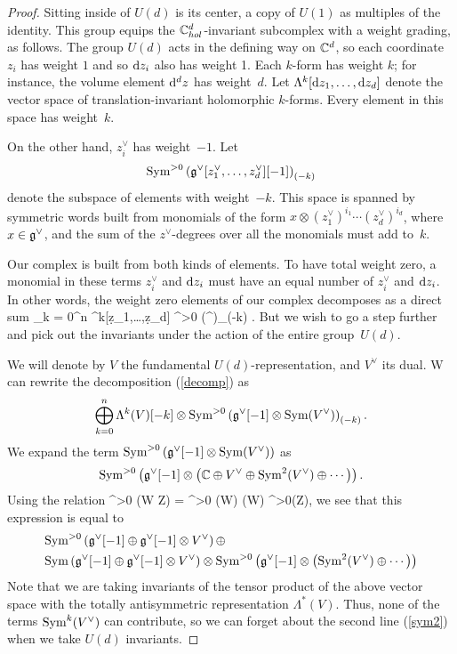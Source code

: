 \begin{proof}
Sitting inside of $U(d)$ is its center, a copy of $U(1)$ as multiples of the identity.
This group equips the $\mathbb C^d_{hol}$-invariant subcomplex with a weight grading, as follows.
The group $U(d)$ acts in the defining way on $\mathbb C^d$,
so each coordinate $z_i$ has weight $1$ and so ${\rm d} z_i$ also has weight 1.
Each $k$-form has weight $k$; for instance, the volume element ${\rm d}^d z$ has weight~$d$.
Let $\Lambda^k[{\rm d} z_1,\ldots,{\rm d} z_d]$ denote the vector space of translation-invariant holomorphic $k$-forms.
Every element in this space has weight~$k$.

On the other hand, $z_i^\vee$ has weight~$-1$. 
Let 
\[
{\rm Sym}^{>0} \left(\mathfrak g^\vee [z_1^\vee,\ldots,z_d^\vee][-1] \right)_{(-k)}
\]
denote the subspace of elements with weight~$-k$.
This space is spanned by symmetric words built from monomials of the form $x \otimes (z_1^\vee)^{i_1} \cdots (z_d^\vee)^{i_d}$, where $x \in \mathfrak g^\vee$,
and the sum of the $z^\vee$-degrees over all the monomials must add to~$k$.

Our complex is built from both kinds of elements.
To have total weight zero, a monomial in these terms $z_i^\vee$ and ${\rm d} z_i$ must have an equal number of $z_i^\vee$ and ${\rm d} z_i$.
In other words, the weight zero elements of our complex decomposes as a direct sum
\beqn\label{decomp}
\bigoplus_{k = 0}^n \Lambda^k[\d z_1,\ldots,\d z_d] \otimes \Sym^{>0} \left(\fg^ \right)_{(-k)} .
\eeqn
But we wish to go a step further and pick out the invariants under the action of the entire group~$U(d)$.

We will denote by $V$ the fundamental $U(d)$-representation, and $V^\vee$ its dual.
W can rewrite the decomposition (\ref{decomp}) as 
\[
\bigoplus_{k = 0}^n \Lambda^k(V)[-k] \otimes {\rm Sym}^{>0} \left(\mathfrak g^\vee [-1] \otimes {\rm Sym}(V^\vee)\right)_{(-k)} .
\]
We expand the term ${\rm Sym}^{>0} \left(\mathfrak g^\vee [-1] \otimes {\rm Sym}(V^\vee)\right)$ as
\[
{\rm Sym}^{>0} \left(\mathfrak g^\vee[-1] \otimes \left(\mathbb C \oplus V^\vee  \oplus {\rm Sym}^2(V^\vee)\oplus \cdots \right)\right) .
\]
Using the relation 
\beqn\label{symrel}
\Sym^{>0} (W \oplus Z) = \Sym^{>0} (W) \oplus \Sym(W) \tensor \Sym^{>0}(Z),
\eeqn
we see that this expression is equal to 
\begin{align}
& {\rm Sym}^{>0} \left(\mathfrak g^\vee[-1] \oplus \mathfrak g^\vee [-1] \otimes V^\vee\right) \oplus \label{sym1} \\
& {\rm Sym} \left(\mathfrak g^\vee[-1] \oplus \mathfrak g^\vee [-1] \otimes V^\vee\right) \otimes {\rm Sym}^{>0} \left(\mathfrak g^\vee[-1] \otimes \left({\rm Sym}^2(V^\vee)\oplus \cdots \right) \label{sym2} \right)
\end{align}
Note that we are taking invariants of the tensor product of the above vector space with the totally antisymmetric representation $\Lambda^*(V)$. 
Thus, none of the terms ${\rm Sym}^k(V^\vee)$ can contribute, so we can forget about the second line (\ref{sym2}) when we take $U(d)$ invariants. 


\end{proof}

